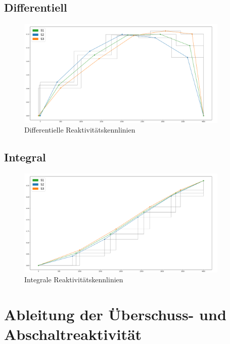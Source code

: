 \documentclass[12pt,german]{article}
\begin{document}
    \subsection{Differentiell}
    \begin{figure}[H]
        \centering
        \includegraphics[width=0.9\textwidth]{kennlinien_differential.png}
        \caption{Differentielle Reaktivitätskennlinien}
    \end{figure}
    \subsection{Integral}
    \begin{figure}[H]
        \centering
        \includegraphics[width=0.9\textwidth]{kennlinien_integral.png}
        \caption{Integrale Reaktivitätskennlinien}
    \end{figure}

    \section{Ableitung der Überschuss- und Abschaltreaktivität}
\end{document}
